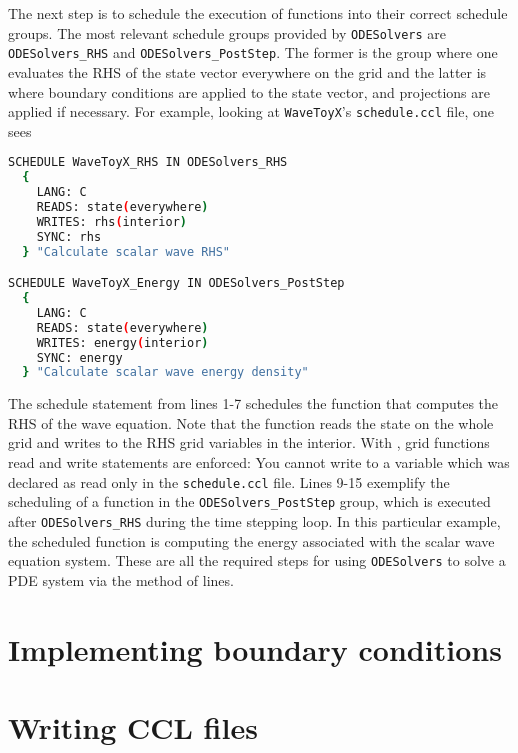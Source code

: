 The next step is to schedule the execution of functions into their correct schedule groups. The most relevant schedule groups provided by \texttt{ODESolvers} are \texttt{ODESolvers\_RHS} and \texttt{ODESolvers\_PostStep}. The former is the group where one evaluates the RHS of the state vector everywhere on the grid and the latter is where boundary conditions are applied to the state vector, and projections are applied if necessary. For example, looking at \texttt{WaveToyX}'s \texttt{schedule.ccl} file, one sees

\begin{lstlisting}[language=bash]
  SCHEDULE WaveToyX_RHS IN ODESolvers_RHS
  {
    LANG: C
    READS: state(everywhere)
    WRITES: rhs(interior)
    SYNC: rhs
  } "Calculate scalar wave RHS"

SCHEDULE WaveToyX_Energy IN ODESolvers_PostStep
  {
    LANG: C
    READS: state(everywhere)
    WRITES: energy(interior)
    SYNC: energy
  } "Calculate scalar wave energy density"
\end{lstlisting}

The schedule statement from lines 1-7 schedules the function that computes the RHS of the wave equation. Note that the function reads the state on the whole grid and writes to the RHS grid variables in the interior. With \CarpetX, grid functions read and write statements are enforced: You cannot write to a variable which was declared as read only in the \texttt{schedule.ccl} file. Lines 9-15 exemplify the scheduling of a function in the \texttt{ODESolvers\_PostStep} group, which is executed after \texttt{ODESolvers\_RHS} during the time stepping loop. In this particular example, the scheduled function is computing the energy associated with the scalar wave equation system. These are all the required steps for using \texttt{ODESolvers} to solve a PDE system via the method of lines.


\section{Implementing boundary conditions}
\label{sec:bcs}

\section{Writing CCL files}
\label{sec:ccl_files}

